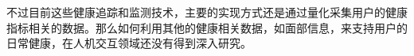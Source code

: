 
不过目前这些健康追踪和监测技术，主要的实现方式还是通过量化采集用户的健康指标相关的数据。那么如何利用其他的健康相关数据，如面部信息，来支持用户的日常健康，在人机交互领域还没有得到深入研究。




 


